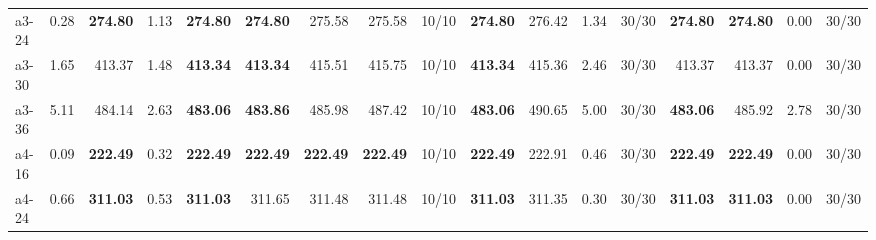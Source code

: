 \documentclass[aspectratio=1610]{beamer}
\begin{document}
\begin{frame}[noframenumbering]
\begin{table}[]
{\begin{tabular}{lrrrrrrrrrrrrrrrr}
a3-24                                          & 0.28                                                    & \multicolumn{1}{r|}{\textbf{274.80}} & 1.13                                                         & \textbf{274.80} & \multicolumn{1}{r|}{{\color[HTML]{FE0000} \textbf{274.80}}} & 275.58          & 275.58                                 & \multicolumn{1}{r|}{10/10} & \textbf{274.80} & 276.42                                 & 1.34   & \multicolumn{1}{r|}{30/30} & \textbf{274.80}    & {\color[HTML]{FE0000} \textbf{274.80}}    & 0.00      & 30/30   \\
a3-30                                          & 1.65                                                    & \multicolumn{1}{r|}{413.37}          & 1.48                                                         & \textbf{413.34} & \multicolumn{1}{r|}{{\color[HTML]{FE0000} \textbf{413.34}}} & 415.51          & 415.75                                 & \multicolumn{1}{r|}{10/10} & \textbf{413.34} & 415.36                                 & 2.46   & \multicolumn{1}{r|}{30/30} & 413.37             & 413.37                                    & 0.00      & 30/30   \\
a3-36                                          & 5.11                                                    & \multicolumn{1}{r|}{484.14}          & 2.63                                                         & \textbf{483.06} & \multicolumn{1}{r|}{{\color[HTML]{FE0000} \textbf{483.86}}} & 485.98          & 487.42                                 & \multicolumn{1}{r|}{10/10} & \textbf{483.06} & 490.65                                 & 5.00   & \multicolumn{1}{r|}{30/30} & \textbf{483.06}    & 485.92                                    & 2.78      & 30/30   \\
a4-16                                          & 0.09                                                    & \multicolumn{1}{r|}{\textbf{222.49}} & 0.32                                                         & \textbf{222.49} & \multicolumn{1}{r|}{{\color[HTML]{FE0000} \textbf{222.49}}} & \textbf{222.49} & {\color[HTML]{FE0000} \textbf{222.49}} & \multicolumn{1}{r|}{10/10} & \textbf{222.49} & 222.91                                 & 0.46   & \multicolumn{1}{r|}{30/30} & \textbf{222.49}    & {\color[HTML]{FE0000} \textbf{222.49}}    & 0.00      & 30/30   \\
a4-24                                          & 0.66                                                    & \multicolumn{1}{r|}{\textbf{311.03}} & 0.53                                                         & \textbf{311.03} & \multicolumn{1}{r|}{311.65}                                 & 311.48          & 311.48                                 & \multicolumn{1}{r|}{10/10} & \textbf{311.03} & 311.35                                 & 0.30   & \multicolumn{1}{r|}{30/30} & \textbf{311.03}    & {\color[HTML]{FE0000} \textbf{311.03}}    & 0.00      & 30/30   \\

\end{tabular}}
\end{table}
\end{frame}
\end{document}
